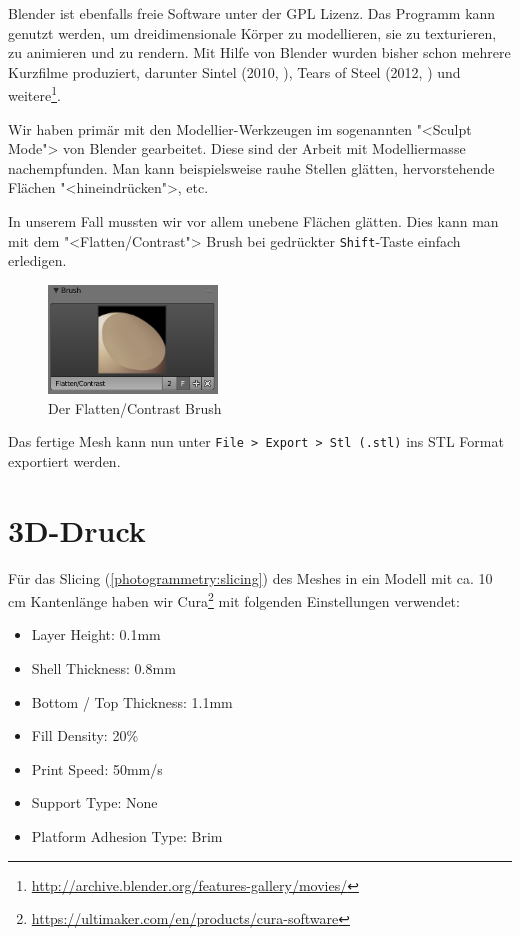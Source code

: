 Blender ist ebenfalls freie Software unter der GPL Lizenz. Das Programm kann
genutzt werden, um dreidimensionale Körper zu modellieren, sie zu texturieren,
zu animieren und zu rendern. Mit Hilfe von Blender wurden bisher schon mehrere
Kurzfilme produziert, darunter Sintel (2010, \cite{sintel}), Tears of Steel
(2012, \cite{tearsofsteel}) und
weitere\footnote{\url{http://archive.blender.org/features-gallery/movies/}}.

Wir haben primär mit den Modellier-Werkzeugen im sogenannten "<Sculpt Mode"> von
Blender gearbeitet. Diese sind der Arbeit mit Modelliermasse nachempfunden. Man
kann beispielsweise rauhe Stellen glätten, hervorstehende Flächen
"<hineindrücken">, etc. 

In unserem Fall mussten wir vor allem unebene Flächen glätten. Dies kann man mit
dem "<Flatten/Contrast"> Brush bei gedrückter \texttt{Shift}-Taste einfach
erledigen.

\begin{figure}[H]
	\centering
	\includegraphics[width=0.4\textwidth]{images/blender_flatten_brush.png}
	\caption{Der Flatten/Contrast Brush}
	\label{img:blender_brush}
\end{figure}

Das fertige Mesh kann nun unter \texttt{File > Export > Stl (.stl)} ins STL
Format exportiert werden.


\section{3D-Druck}

Für das Slicing (\autoref{photogrammetry:slicing}) des Meshes in ein Modell mit
ca. 10 cm Kantenlänge haben wir
Cura\footnote{\url{https://ultimaker.com/en/products/cura-software}} mit
folgenden Einstellungen verwendet:

\begin{itemize}
	\setlength\itemsep{0.3em}
	\item Layer Height: 0.1mm
	\item Shell Thickness: 0.8mm
	\item Bottom / Top Thickness: 1.1mm
	\item Fill Density: 20\%
	\item Print Speed: 50mm/s
	\item Support Type: None
	\item Platform Adhesion Type: Brim
\end{itemize}

